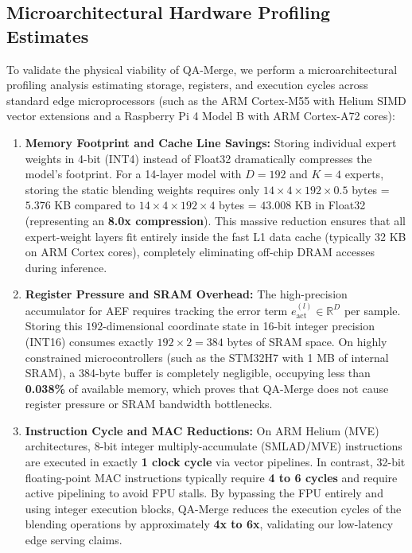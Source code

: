 \documentclass{article}
\theoremstyle{plain}
\theoremstyle{definition}
\theoremstyle{remark}
\begin{document}
\subsection{Microarchitectural Hardware Profiling Estimates}
To validate the physical viability of QA-Merge, we perform a microarchitectural profiling analysis estimating storage, registers, and execution cycles across standard edge microprocessors (such as the ARM Cortex-M55 with Helium SIMD vector extensions and a Raspberry Pi 4 Model B with ARM Cortex-A72 cores):
\begin{enumerate}
    \item \textbf{Memory Footprint and Cache Line Savings:} Storing individual expert weights in 4-bit (INT4) instead of Float32 dramatically compresses the model's footprint. For a 14-layer model with $D=192$ and $K=4$ experts, storing the static blending weights requires only $14 \times 4 \times 192 \times 0.5$ bytes = $5.376$ KB compared to $14 \times 4 \times 192 \times 4$ bytes = $43.008$ KB in Float32 (representing an \textbf{8.0x compression}). This massive reduction ensures that all expert-weight layers fit entirely inside the fast L1 data cache (typically 32 KB on ARM Cortex cores), completely eliminating off-chip DRAM accesses during inference.
    \item \textbf{Register Pressure and SRAM Overhead:} The high-precision accumulator for AEF requires tracking the error term $e_{\text{act}}^{(l)} \in \mathbb{R}^D$ per sample. Storing this $192$-dimensional coordinate state in 16-bit integer precision (INT16) consumes exactly $192 \times 2 = 384$ bytes of SRAM space. On highly constrained microcontrollers (such as the STM32H7 with 1 MB of internal SRAM), a 384-byte buffer is completely negligible, occupying less than \textbf{0.038\%} of available memory, which proves that QA-Merge does not cause register pressure or SRAM bandwidth bottlenecks.
    \item \textbf{Instruction Cycle and MAC Reductions:} On ARM Helium (MVE) architectures, 8-bit integer multiply-accumulate (SMLAD/MVE) instructions are executed in exactly \textbf{1 clock cycle} via vector pipelines. In contrast, 32-bit floating-point MAC instructions typically require \textbf{4 to 6 cycles} and require active pipelining to avoid FPU stalls. By bypassing the FPU entirely and using integer execution blocks, QA-Merge reduces the execution cycles of the blending operations by approximately \textbf{4x to 6x}, validating our low-latency edge serving claims.
\end{enumerate}
\end{document}
